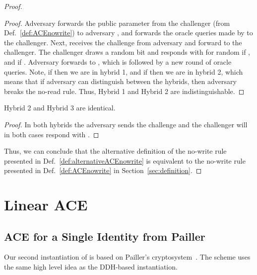 \documentclass{llncs}
\begin{document}
\begin{proof}
\begin{proof}
Adversary  forwards the public parameter from the challenger (from Def.~\ref{def:ACEnowrite}) to adversary , and forwards the oracle queries made by  to the challenger. 
Next,  receives the challenge  from adversary  and forward  to the challenger.
The challenger draws a random bit  and responds with  for random  if , and  if . 
Adversary  forwards  to , which is followed by a new round of oracle queries. 
Note, if  then we are in hybrid 1, and if  then we are in hybrid 2, which means that if adversary  can distinguish between the hybrids, then adversary  breaks the no-read rule. Thus, Hybrid 1 and Hybrid 2 are indistinguishable.
\end{proof}

\begin{claim}
Hybrid 2 and Hybrid 3 are identical.
\end{claim}

\begin{proof}
In both hybrids the adversary sends the challenge  and the challenger will in both cases respond with .
\end{proof}

Thus, we can conclude that the alternative definition of the no-write rule presented in Def.~\ref{def:alternativeACEnowrite} is equivalent to the no-write rule presented in Def.~\ref{def:ACEnowrite} in Section~\ref{sec:definition}.
\end{proof}





\section{Linear ACE}

\subsection{ACE for a Single Identity from Pailler}\label{app:onepailler}

Our second instantiation of \oACE is based on Pailler's cryptosystem~\cite{DBLP:conf/eurocrypt/Paillier99,DBLP:conf/pkc/DamgardJ01}. The scheme uses the same high level idea as the DDH-based instantiation.
\end{document}
